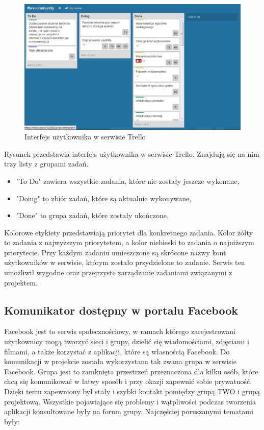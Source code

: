 \begin{figure}[h]
	\centering
	\includegraphics[width=1.00\textwidth]{images/trello.png}
	\caption{Interfejs użytkownika w serwisie Trello}
\end{figure}


Rysunek przedstawia interfejs użytkownika w serwisie Trello. Znajdują się na nim trzy listy z grupami zadań.

\begin{itemize}
\item "To Do" zawiera wszystkie zadania, które nie zostały jeszcze wykonane,
\item "Doing" to zbiór zadań, które są aktualnie wykonywane,
\item "Done" to grupa zadań, które zostały ukończone.
\end{itemize}


Kolorowe etykiety przedstawiają priorytet dla konkretnego zadania. Kolor żółty to zadania z najwyższym priorytetem, a kolor niebieski to zadania o najniższym priorytecie. Przy każdym zadaniu umieszczone są skrócone nazwy kont użytkowników w serwisie, którym zostało przydzielone to zadanie. 
Serwis ten umożliwił wygodne oraz przejrzyste zarządzanie zadaniami związanymi z projektem.

\subsection{Komunikator dostępny w portalu Facebook}
Facebook jest to serwis społecznościowy, w ramach którego zarejestrowani użytkownicy mogą tworzyć sieci i grupy, dzielić się wiadomościami, zdjęciami i filmami, a także korzystać z aplikacji, które są własnością Facebook. Do komunikacji w projekcie została wykorzystana tak zwana grupa w serwisie Facebook. Grupa  jest to zamknięta przestrzeń przeznaczona dla kilku osób, które chcą się komunikować w łatwy sposób i przy okazji zapewnić sobie prywatność. Dzięki temu zapewniony był stały i szybki kontakt pomiędzy grupą TWO i grupą projektową. Wszystkie pojawiające się problemy i wątpliwości podczas tworzenia aplikacji konsultowane były na forum grupy. Najczęściej poruszanymi tematami były:

